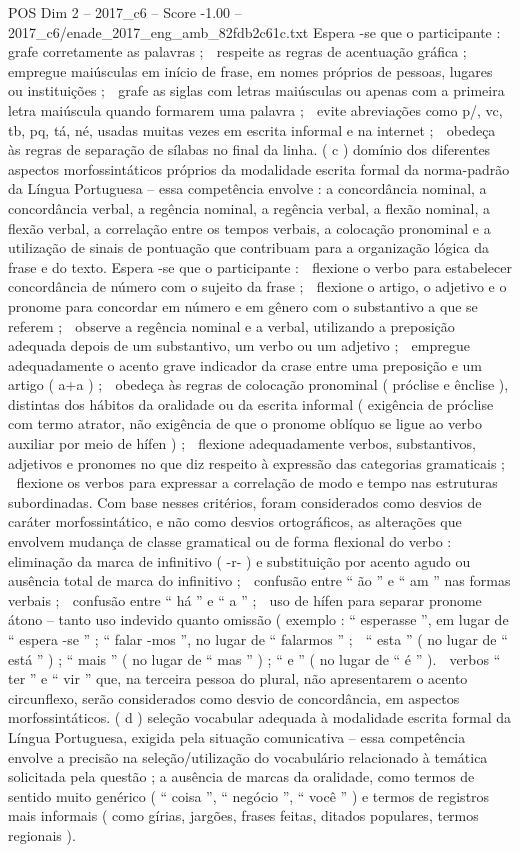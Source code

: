 \begin{textsample}{POS Dim 2 – 2017\_c6 – Score -1.00 – 2017\_c6/enade\_2017\_eng\_amb\_82fdb2c61c.txt}
Espera -se que o participante :  grafe corretamente as palavras ;  respeite as regras de acentuação gráfica ;  empregue maiúsculas em início de frase, em nomes próprios de pessoas, lugares ou instituições ;  grafe as siglas com letras maiúsculas ou apenas com a primeira letra maiúscula quando formarem uma palavra ;  evite abreviações como p/, vc, tb, pq, tá, né, usadas muitas vezes em escrita informal e na internet ;  obedeça às regras de separação de sílabas no final da linha. ( c ) domínio dos diferentes aspectos morfossintáticos próprios da modalidade escrita formal da norma-padrão da Língua Portuguesa – essa competência envolve : a concordância nominal, a concordância verbal, a regência nominal, a regência verbal, a flexão nominal, a flexão verbal, a correlação entre os tempos verbais, a colocação pronominal e a utilização de sinais de pontuação que contribuam para a organização lógica da frase e do texto.
Espera -se que o participante :  flexione o verbo para estabelecer concordância de número com o sujeito da frase ;  flexione o artigo, o adjetivo e o pronome para concordar em número e em gênero com o substantivo a que se referem ;  observe a regência nominal e a verbal, utilizando a preposição adequada depois de um substantivo, um verbo ou um adjetivo ;  empregue adequadamente o acento grave indicador da crase entre uma preposição e um artigo ( a+a ) ;  obedeça às regras de colocação pronominal ( próclise e ênclise ), distintas dos hábitos da oralidade ou da escrita informal ( exigência de próclise com termo atrator, não exigência de que o pronome oblíquo se ligue ao verbo auxiliar por meio de hífen ) ;  flexione adequadamente verbos, substantivos, adjetivos e pronomes no que diz respeito à expressão das categorias gramaticais ;  flexione os verbos para expressar a correlação de modo e tempo nas estruturas subordinadas.
Com base nesses critérios, foram considerados como desvios de caráter morfossintático, e não como desvios ortográficos, as alterações que envolvem mudança de classe gramatical ou de forma flexional do verbo :  eliminação da marca de infinitivo ( -r- ) e substituição por acento agudo ou ausência total de marca do infinitivo ;  confusão entre “ ão ” e “ am ” nas formas verbais ;  confusão entre “ há ” e “ a ” ;  uso de hífen para separar pronome átono – tanto uso indevido quanto omissão ( exemplo : “ esperasse ”, em lugar de “ espera -se ” ; “ falar -mos ”, no lugar de “ falarmos ” ;  “ esta ” ( no lugar de “ está ” ) ; “ mais ” ( no lugar de “ mas ” ) ; “ e ” ( no lugar de “ é ” ).  verbos “ ter ” e “ vir ” que, na terceira pessoa do plural, não apresentarem o acento circunflexo, serão considerados como desvio de concordância, em aspectos morfossintáticos. ( d ) seleção vocabular adequada à modalidade escrita formal da Língua Portuguesa, exigida pela situação comunicativa – essa competência envolve a precisão na seleção/utilização do vocabulário relacionado à temática solicitada pela questão ; a ausência de marcas da oralidade, como termos de sentido muito genérico ( “ coisa ”, “ negócio ”, “ você ” ) e termos de registros mais informais ( como gírias, jargões, frases feitas, ditados populares, termos regionais ).

\end{textsample}
